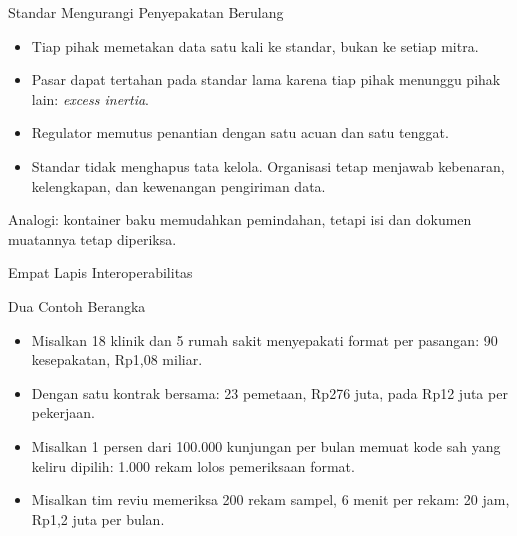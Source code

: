 \documentclass[aspectratio=169, table, 12pt]{beamer}
\begin{document}
\begin{frame}{{\Large Standar Mengurangi Penyepakatan Berulang}}
  \vspace{8pt}
  \begin{itemize}
    \item Tiap pihak memetakan data satu kali ke standar, bukan ke setiap mitra.
    \item Pasar dapat tertahan pada standar lama karena tiap pihak menunggu pihak lain: \textit{excess inertia}.
    \item Regulator memutus penantian dengan satu acuan dan satu tenggat.
    \item Standar tidak menghapus tata kelola. Organisasi tetap menjawab kebenaran, kelengkapan, dan kewenangan pengiriman data.
  \end{itemize}
  \vspace{6pt}
  {\small Analogi: kontainer baku memudahkan pemindahan, tetapi isi dan dokumen muatannya tetap diperiksa.}
\end{frame}

\begin{frame}{{\Large Empat Lapis Interoperabilitas}}
  \centering
\end{frame}

\begin{frame}{{\Large Dua Contoh Berangka}}
  \vspace{8pt}
  \begin{itemize}
    \item Misalkan 18 klinik dan 5 rumah sakit menyepakati format per pasangan: 90 kesepakatan, Rp1,08 miliar.
    \item Dengan satu kontrak bersama: 23 pemetaan, Rp276 juta, pada Rp12 juta per pekerjaan.
    \item Misalkan 1 persen dari 100.000 kunjungan per bulan memuat kode sah yang keliru dipilih: 1.000 rekam lolos pemeriksaan format.
    \item Misalkan tim reviu memeriksa 200 rekam sampel, 6 menit per rekam: 20 jam, Rp1,2 juta per bulan.
  \end{itemize}
\end{frame}
\end{document}
